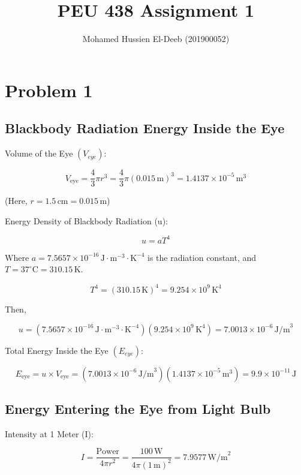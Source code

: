 \documentclass[12pt]{article}
\title{PEU 438 Assignment 1}
\author{Mohamed Hussien El-Deeb (201900052)}
\date{}
\begin{document}
\maketitle
\tableofcontents

\newcommand{\Lagr}{\mathcal{L}}

\newpage

\section{Problem 1}

\subsection{Blackbody Radiation Energy Inside the Eye}

Volume of the Eye $(V_{eye})$:

\[
    V_{\text{eye}} = \frac{4}{3} \pi r^3
    = \frac{4}{3} \pi {(0.015\, \text{m})}^3 = 1.4137 \times 10^{-5}\, \text{m}^3
\]

(Here, \( r = 1.5\, \text{cm} = 0.015\, \text{m} \))

Energy Density of Blackbody Radiation (u):

\[
    u = a T^4
\]

Where
\( a = 7.5657 \times 10^{-16}\, \text{J}\cdot\text{m}^{-3}\cdot\text{K}^{-4} \)
is the radiation constant,
and \( T = 37^\circ\text{C} = 310.15\, \text{K} \).

\[
    T^4 = {(310.15\, \text{K})}^4 = 9.254 \times 10^9\, \text{K}^4
\]

Then,

\[
    u =
    (7.5657 \times 10^{-16}\, \text{J}\cdot\text{m}^{-3}\cdot\text{K}^{-4})(9.254 \times 10^9\, \text{K}^4)
    = 7.0013 \times 10^{-6}\, \text{J/m}^3
\]

Total Energy Inside the Eye $(E_{eye})$:

\[
    E_{\text{eye}}
    = u \times V_{\text{eye}}
    = (7.0013 \times 10^{-6}\, \text{J/m}^3)(1.4137 \times 10^{-5}\, \text{m}^3)
    = 9.9 \times 10^{-11}\, \text{J}
\]

\subsection{Energy Entering the Eye from Light Bulb}

Intensity at 1 Meter (I):

\[
    I
    = \frac{\text{Power}}{4\pi r^2}
    = \frac{100\, \text{W}}{4\pi {(1\, \text{m})}^2}
    = 7.9577\, \text{W/m}^2
\]
\end{document}
